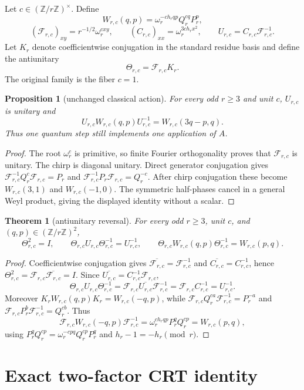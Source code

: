 \documentclass[11pt]{article}
\newtheorem{theorem}{Theorem}
\newtheorem{proposition}{Proposition}
\newcommand{\F}{\mathcal F}
\newcommand{\Z}{\mathbb Z}
\begin{document}
Let $c\in(\Z/r\Z)^\times$.  Define
\[
 W_{r,c}(q,p)=\omega_r^{-ch_rqp}Q_r^{cq}P_r^p,
\]
\[
 (\F_{r,c})_{xy}=r^{-1/2}\omega_r^{cxy},\qquad
 (C_{r,c})_{xx}=\omega_r^{3ch_rx^2},\qquad
 U_{r,c}=C_{r,c}\F_{r,c}^{-1}.
\]
Let $K_r$ denote coefficientwise conjugation in the standard residue basis and
define the antiunitary
\[
 \Theta_{r,c}=\F_{r,c}K_r.
\]
The original family is the fiber $c=1$.

\begin{proposition}[unchanged classical action]\label{prop:egorov}
For every odd $r\ge3$ and unit $c$, $U_{r,c}$ is unitary and
\[
 U_{r,c}W_{r,c}(q,p)U_{r,c}^{-1}=W_{r,c}(3q-p,q).
\]
Thus one quantum step still implements one application of $A$.
\end{proposition}

\begin{proof}
The root $\omega_r^c$ is primitive, so finite Fourier orthogonality proves
that $\F_{r,c}$ is unitary.  The chirp is diagonal unitary.  Direct generator
conjugation gives
$\F_{r,c}^{-1}Q_r^c\F_{r,c}=P_r$ and
$\F_{r,c}^{-1}P_r\F_{r,c}=Q_r^{-c}$.  After chirp conjugation these become
$W_{r,c}(3,1)$ and $W_{r,c}(-1,0)$.  The symmetric half-phases cancel in a
general Weyl product, giving the displayed identity without a scalar.
\end{proof}

\begin{theorem}[antiunitary reversal]\label{thm:antiunitary}
For every odd $r\ge3$, unit $c$, and $(q,p)\in(\Z/r\Z)^2$,
\[
 \Theta_{r,c}^2=I,\qquad
 \Theta_{r,c}U_{r,c}\Theta_{r,c}^{-1}=U_{r,c}^{-1},\qquad
 \Theta_{r,c}W_{r,c}(q,p)\Theta_{r,c}^{-1}=W_{r,c}(p,q).
\]
\end{theorem}

\begin{proof}
Coefficientwise conjugation gives
$\overline{\F_{r,c}}=\F_{r,c}^{-1}$ and
$\overline{C_{r,c}}=C_{r,c}^{-1}$, hence
$\Theta_{r,c}^2=\F_{r,c}\overline{\F_{r,c}}=I$.  Since
$\overline{U_{r,c}}=C_{r,c}^{-1}\F_{r,c}$,
\[
 \Theta_{r,c}U_{r,c}\Theta_{r,c}^{-1}
 =\F_{r,c}\overline{U_{r,c}}\F_{r,c}^{-1}
 =\F_{r,c}C_{r,c}^{-1}=U_{r,c}^{-1}.
\]
Moreover $K_rW_{r,c}(q,p)K_r=W_{r,c}(-q,p)$, while
$\F_{r,c}Q_r^{ca}\F_{r,c}^{-1}=P_r^{-a}$ and
$\F_{r,c}P_r^b\F_{r,c}^{-1}=Q_r^{cb}$.  Thus
\[
 \F_{r,c}W_{r,c}(-q,p)\F_{r,c}^{-1}
 =\omega_r^{ch_rqp}P_r^qQ_r^{cp}=W_{r,c}(p,q),
\]
using $P_r^qQ_r^{cp}=\omega_r^{-cpq}Q_r^{cp}P_r^q$ and
$h_r-1=-h_r\pmod r$.
\end{proof}

\section{Exact two-factor CRT identity}
\end{document}
